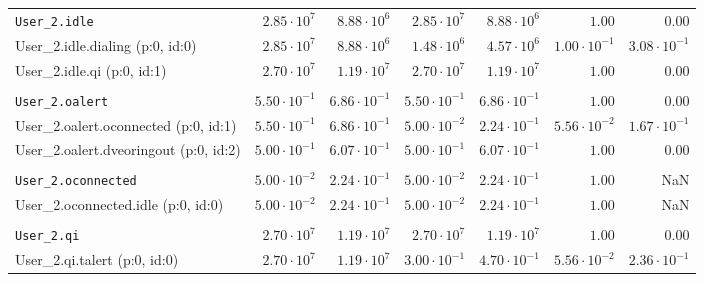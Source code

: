 \begin{table}[htbp]
{\begin{tabular}{lrrrrrr}
\\[-8pt]\texttt{User\_2.idle}                         &  $2.85 \cdot 10^{7}$ &  $8.88 \cdot 10^{6}$ &  $2.85 \cdot 10^{7}$ &  $8.88 \cdot 10^{6}$ &               $1.00$ &               $0.00$ \\
\hspace{3mm}User\_2.idle.dialing (p:0, id:0)          &  $2.85 \cdot 10^{7}$ &  $8.88 \cdot 10^{6}$ &  $1.48 \cdot 10^{6}$ &  $4.57 \cdot 10^{6}$ & $1.00 \cdot 10^{-1}$ & $3.08 \cdot 10^{-1}$ \\
\hspace{3mm}User\_2.idle.qi (p:0, id:1)               &  $2.70 \cdot 10^{7}$ &  $1.19 \cdot 10^{7}$ &  $2.70 \cdot 10^{7}$ &  $1.19 \cdot 10^{7}$ &               $1.00$ &               $0.00$ \\
\\[-8pt]\texttt{User\_2.oalert}                       & $5.50 \cdot 10^{-1}$ & $6.86 \cdot 10^{-1}$ & $5.50 \cdot 10^{-1}$ & $6.86 \cdot 10^{-1}$ &               $1.00$ &               $0.00$ \\
\hspace{3mm}User\_2.oalert.oconnected (p:0, id:1)     & $5.50 \cdot 10^{-1}$ & $6.86 \cdot 10^{-1}$ & $5.00 \cdot 10^{-2}$ & $2.24 \cdot 10^{-1}$ & $5.56 \cdot 10^{-2}$ & $1.67 \cdot 10^{-1}$ \\
\hspace{3mm}User\_2.oalert.dveoringout (p:0, id:2)    & $5.00 \cdot 10^{-1}$ & $6.07 \cdot 10^{-1}$ & $5.00 \cdot 10^{-1}$ & $6.07 \cdot 10^{-1}$ &               $1.00$ &               $0.00$ \\
\\[-8pt]\texttt{User\_2.oconnected}                   & $5.00 \cdot 10^{-2}$ & $2.24 \cdot 10^{-1}$ & $5.00 \cdot 10^{-2}$ & $2.24 \cdot 10^{-1}$ &               $1.00$ &                  NaN \\
\hspace{3mm}User\_2.oconnected.idle (p:0, id:0)       & $5.00 \cdot 10^{-2}$ & $2.24 \cdot 10^{-1}$ & $5.00 \cdot 10^{-2}$ & $2.24 \cdot 10^{-1}$ &               $1.00$ &                  NaN \\
\\[-8pt]\texttt{User\_2.qi}                           &  $2.70 \cdot 10^{7}$ &  $1.19 \cdot 10^{7}$ &  $2.70 \cdot 10^{7}$ &  $1.19 \cdot 10^{7}$ &               $1.00$ &               $0.00$ \\
\hspace{3mm}User\_2.qi.talert (p:0, id:0)             &  $2.70 \cdot 10^{7}$ &  $1.19 \cdot 10^{7}$ & $3.00 \cdot 10^{-1}$ & $4.70 \cdot 10^{-1}$ & $5.56 \cdot 10^{-2}$ & $2.36 \cdot 10^{-1}$ \\

\end{tabular}}
\end{table}
